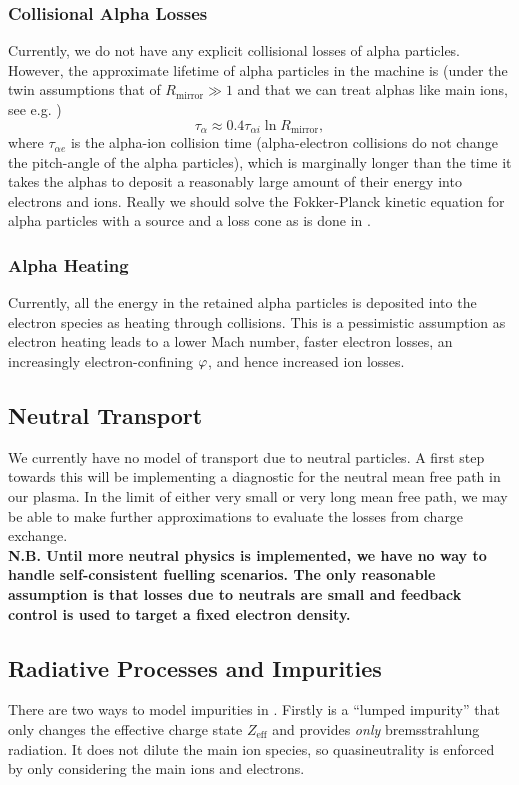 \documentclass{revtex4-2}
\begin{document}
\subsubsection{Collisional Alpha Losses}
Currently, we do not have any explicit collisional losses of alpha particles. However, the approximate lifetime of alpha particles in the machine is (under the twin assumptions that of $R_{\mathrm{mirror}} \gg 1$ and that we can treat alphas like main ions, see e.g. \citet{ryutovOpenTraps})
\begin{equation}
\tau_\alpha \approx 0.4 \tau_{\alpha i} \ln R_{\mathrm{mirror}},
\end{equation}
where $\tau_{\alpha e}$ is the alpha-ion collision time (alpha-electron collisions do not change the pitch-angle of the alpha particles), which is marginally longer than the time it takes the alphas to deposit a reasonably large amount of their energy into electrons and ions.
Really we should solve the Fokker-Planck kinetic equation for alpha particles with a source and a loss cone as is done in \citet{santarius1982}.

\subsubsection{Alpha Heating}
Currently, all the energy in the retained alpha particles is deposited into the electron species as heating through collisions.
This is a pessimistic assumption as electron heating leads to a lower Mach number, faster electron losses, an increasingly electron-confining $\varphi$, and hence increased ion losses. 

\subsection{Neutral Transport}
We currently have no model of transport due to neutral particles. A first step towards this will be implementing a diagnostic for 
the neutral mean free path in our plasma. In the limit of either very small or very long mean free path, we may be able to make further approximations to evaluate the 
losses from charge exchange.
\\
\textbf{N.B. Until more neutral physics is implemented, we have no way to handle self-consistent fuelling scenarios. The only reasonable assumption
	is that losses due to neutrals are small and feedback control is used to target a fixed electron density.}

\subsection{Radiative Processes and Impurities}
There are two ways to model impurities in \mctrans{}. Firstly is a ``lumped impurity'' that only changes the effective charge state $Z_{\mathrm{eff}}$ and 
provides \textit{only} bremsstrahlung radiation. It does not dilute the main ion species, so quasineutrality is enforced by only considering the main ions and 
electrons.
\end{document}
